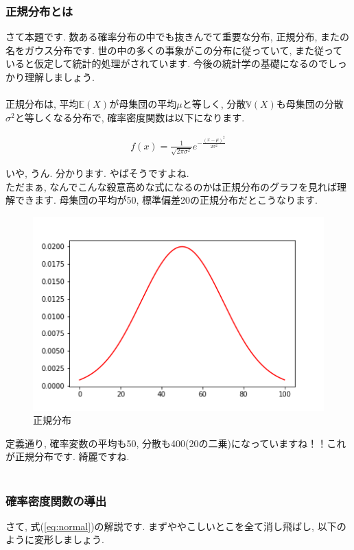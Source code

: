 \documentclass[11pt,a4paper]{jsarticle}                    %
\begin{document}
\subsubsection{正規分布とは}
さて本題です. 数ある確率分布の中でも抜きんでて重要な分布, 正規分布, またの名をガウス分布です. 世の中の多くの事象がこの分布に従っていて, また従っていると仮定して統計的処理がされています. 今後の統計学の基礎になるのでしっかり理解しましょう.\\
\\
正規分布は, 平均$\mathbb{E}(X)$が母集団の平均$μ$と等しく, 分散$\mathbb{V}(X)$も母集団の分散$\sigma ^2$と等しくなる分布で, 確率密度関数は以下になります.

\begin{eqnarray}
\label{eq:normal}
f(x) = \frac{1}{\sqrt{2\pi\sigma^2}}e^{-\frac{(x-\mu)^2}{2\sigma^2}}
\end{eqnarray}

いや, うん. 分かります. やばそうですよね. \\
ただまぁ, なんでこんな殺意高めな式になるのかは正規分布のグラフを見れば理解できます. 母集団の平均が50, 標準偏差20の正規分布だとこうなります.

\begin{figure}[H]
\label{im:normal}
  \centering
  \includegraphics[width=120mm,bb=0 0 432 288]{../figures/normal.png}
  \caption{正規分布}
\end{figure}

定義通り, 確率変数の平均も50, 分散も400(20の二乗)になっていますね！！これが正規分布です. 綺麗ですね.\\
\\
\subsubsection{確率密度関数の導出}
さて, 式(\ref{eq:normal})の解説です. まずややこしいとこを全て消し飛ばし, 以下のように変形しましょう. 
\end{document}
